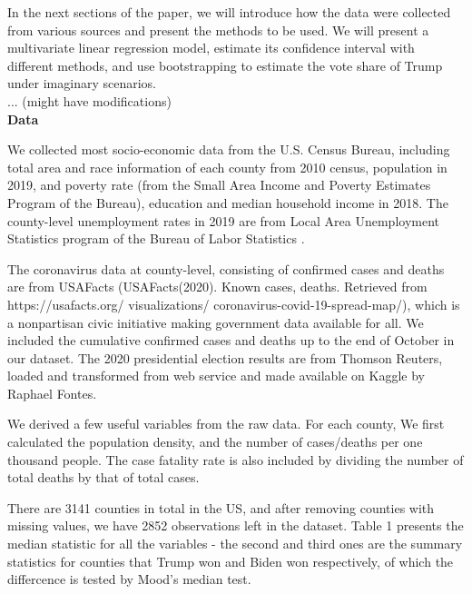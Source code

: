 \documentclass[12pt]{article}
\begin{document}
 In the next sections of the paper, we will introduce how the data were collected from various sources and present the methods to be used. We will present a multivariate linear regression model, estimate its confidence interval with different methods, and use bootstrapping to estimate the vote share of Trump under imaginary scenarios.  \\
 
 
 ... (might have modifications) \\
 
 {\bf Data}
 
 We collected most socio-economic data from the U.S. Census Bureau, including total area and race information of each county from 2010 census, population in 2019, and poverty rate (from the Small Area Income and Poverty Estimates Program of the Bureau), education and median household income in 2018. The county-level unemployment rates in 2019 are from Local Area Unemployment Statistics  program of the Bureau of Labor Statistics .
 
 The coronavirus data at county-level, consisting of confirmed cases and deaths are from USAFacts (USAFacts(2020). Known cases, deaths. Retrieved from https://usafacts.org/
 visualizations/
 coronavirus-covid-19-spread-map/), which is a nonpartisan civic initiative making government data available for all. We included the cumulative confirmed cases and deaths up to the end of October in our dataset. The 2020 presidential election results are from Thomson Reuters, loaded and transformed from web service and made available on Kaggle by Raphael Fontes. 
 
  We derived a few useful variables from the raw data. For each county, We first calculated the population density, and the number of cases/deaths per one thousand people. The case fatality rate is also included by dividing the number of total deaths by that of total cases. 
  
 
 There are 3141 counties in total in the US, and after removing counties with missing values, we have 2852 observations left in the dataset. Table 1 presents the median statistic for all the variables - the second and third ones are the summary statistics for counties that Trump won and Biden won respectively, of which the differcence is tested by Mood's median test.\\
 
\end{document}
